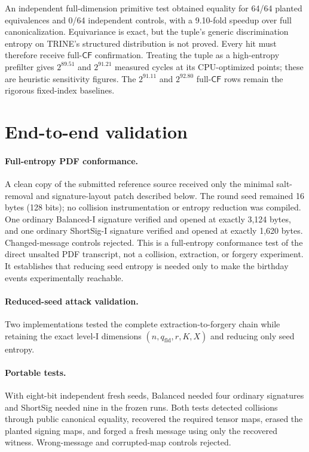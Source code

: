 \documentclass[11pt,a4paper]{article}
\newcommand{\CF}{\mathsf{CF}}
\newcommand{\qfld}{q_{\mathrm{fld}}}
\begin{document}
An independent full-dimension primitive test obtained equality for 64/64 planted
equivalences and 0/64 independent controls, with a 9.10-fold speedup over full
canonicalization.  Equivariance is exact, but the tuple's generic
discrimination entropy on TRINE's structured distribution is not proved.
Every hit must therefore receive full-$\CF$ confirmation.  Treating the tuple
as a high-entropy prefilter gives $2^{89.51}$ and $2^{91.21}$ measured cycles
at its CPU-optimized points; these are heuristic sensitivity figures.  The
$2^{91.11}$ and $2^{92.80}$ full-$\CF$ rows remain the rigorous fixed-index
baselines.

\section{End-to-end validation}

\paragraph{Full-entropy PDF conformance.}
A clean copy of the submitted reference source received only the minimal
salt-removal and signature-layout patch described below.  The round seed
remained 16 bytes (128 bits); no collision instrumentation or entropy
reduction was compiled.  One ordinary Balanced-I signature verified and
opened at exactly 3,124 bytes, and one ordinary ShortSig-I signature verified
and opened at exactly 1,620 bytes.  Changed-message controls rejected.  This
is a full-entropy conformance test of the direct unsalted PDF transcript, not a
collision, extraction, or forgery experiment.  It establishes that reducing
seed entropy is needed only to make the birthday events experimentally
reachable.

\paragraph{Reduced-seed attack validation.}
Two implementations tested the complete extraction-to-forgery chain while
retaining the exact level-I dimensions $(n,\qfld,r,K,X)$ and reducing only
seed entropy.

\paragraph{Portable tests.}
With eight-bit independent fresh seeds, Balanced needed four ordinary
signatures and ShortSig needed nine in the frozen runs.  Both tests detected
collisions through public canonical equality, recovered the required tensor
maps, erased the planted signing maps, and forged a fresh message using only
the recovered witness.  Wrong-message and corrupted-map controls rejected.
\end{document}
